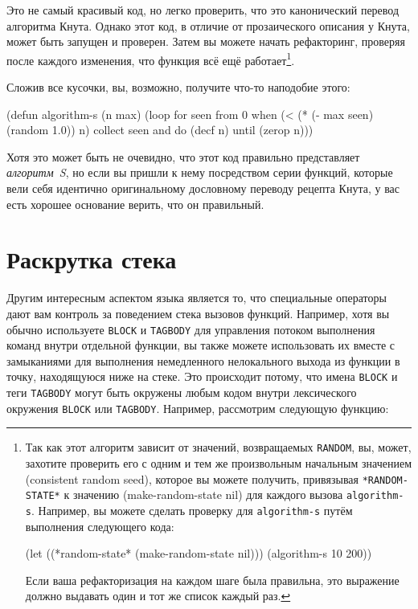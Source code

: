 Это не самый красивый код, но легко проверить, что это канонический перевод алгоритма
Кнута. Однако этот код, в отличие от прозаического описания у Кнута, может быть запущен и
проверен. Затем вы можете начать рефакторинг, проверяя после каждого изменения, что
функция всё ещё работает\footnote{Так как этот алгоритм зависит от значений, возвращаемых
  \lstinline{RANDOM}, вы, может, захотите проверить его с одним и тем же произвольным
  начальным значением (consistent random seed), которое вы можете получить, привязывая
  \lstinline{*RANDOM-STATE*} к значению (make-random-state nil) для каждого вызова
  \lstinline{algorithm-s}. Например, вы можете сделать проверку для
  \lstinline{algorithm-s} путём выполнения следующего кода:

\begin{myverb}
(let ((*random-state* (make-random-state nil))) (algorithm-s 10 200))
\end{myverb}

Если ваша рефакторизация на каждом шаге была правильна, это выражение должно выдавать один
и тот же список каждый раз.}\hspace{\footnotenegspace}.

Сложив все кусочки, вы, возможно, получите что-то наподобие этого:

\begin{myverb}
(defun algorithm-s (n max)
  (loop for seen from 0
     when (< (* (- max seen) (random 1.0)) n)
     collect seen and do (decf n)
     until (zerop n)))
\end{myverb}

Хотя это может быть не очевидно, что этот код правильно представляет \textit{алгоритм~S},
но если вы пришли к нему посредством серии функций, которые вели себя идентично
оригинальному дословному переводу рецепта Кнута, у вас есть хорошее основание верить, что
он правильный.

\section{Раскрутка стека}

Другим интересным аспектом языка является то, что специальные операторы дают вам контроль
за поведением стека вызовов функций. Например, хотя вы обычно используете
\lstinline{BLOCK} и \lstinline{TAGBODY} для управления потоком выполнения команд внутри
отдельной функции, вы также можете использовать их вместе с замыканиями для выполнения
немедленного нелокального выхода из функции в точку, находящуюся ниже на стеке. Это
происходит потому, что имена \lstinline{BLOCK} и теги \lstinline{TAGBODY} могут быть
окружены любым кодом внутри лексического окружения \lstinline{BLOCK} или
\lstinline{TAGBODY}.  Например, рассмотрим следующую функцию:

